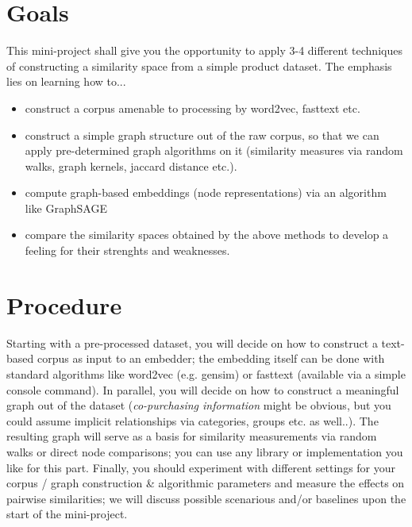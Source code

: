 \documentclass[review]{elsarticle}
\begin{document}
\section{Goals}
\label{sect:goals}

This mini-project shall give you the opportunity to apply 3-4 different techniques of constructing a similarity space from a simple product dataset. The emphasis lies on learning how to...

\begin{itemize}
  \item construct a corpus amenable to processing by word2vec, fasttext etc.
  \item construct a simple graph structure out of the raw corpus, so that we can apply pre-determined graph algorithms on it (similarity measures via random walks, graph kernels, jaccard distance etc.).
  \item compute graph-based embeddings (node representations) via an algorithm like GraphSAGE
  \item compare the similarity spaces obtained by the above methods to develop a feeling for their strenghts and weaknesses.
\end{itemize}



\section{Procedure}
\label{sect:procedure}

Starting with a pre-processed dataset, you will decide on how to construct a text-based corpus as input to an embedder; the embedding itself can be done with standard algorithms like word2vec (e.g. gensim) or fasttext (available via a simple console command). In parallel, you will decide on how to construct a meaningful graph out of the dataset (\textit{co-purchasing information} might be obvious, but you could assume implicit relationships via categories, groups etc. as well..). The resulting graph will serve as a basis for similarity measurements via random walks or direct node comparisons; you can use any library or implementation you like for this part. Finally, you should experiment with different settings for your corpus / graph construction \& algorithmic parameters and measure the effects on pairwise similarities; we will discuss possible scenarious and/or baselines upon the start of the mini-project.


\end{document}
